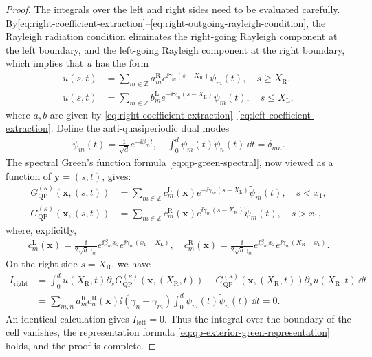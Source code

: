 \begin{proof}
The integrals over the left and right sides need to be evaluated carefully. By\eqref{eq:right-coefficient-extraction}--\eqref{eq:right-outgoing-rayleigh-condition},
the Rayleigh radiation condition eliminates the
right-going Rayleigh component at the left boundary, and the left-going Rayleigh component at the right boundary, which implies that $u$ has the form 
\begin{align*}
  u(s,t) &= \sum_{m\in\mathbb Z} a_m^\mathrm{R} e^{\ii\gamma_m (s - X_\mathrm{R})}\psi_m(t), \quad s \geq X_\mathrm{R},\\
  u(s,t) &= \sum_{m\in\mathbb Z} b_m^\mathrm{L} e^{-\ii\gamma_m (s - X_\mathrm{L})}\psi_m(t), \quad s \leq X_\mathrm{L},
\end{align*}
where $a, b$ are given by \eqref{eq:right-coefficient-extraction}--\eqref{eq:left-coefficient-extraction}. Define the anti-quasiperiodic dual modes 
\begin{align*}
  \widetilde{\psi}_m(t) = \frac{1}{\sqrt{d}} e^{-\ii \beta_m t},\quad \int_0^d \psi_m(t) \widetilde{\psi}_n(t) \, \dd t = \delta_{mn}.
\end{align*}
The spectral Green's function formula \eqref{eq:qp-green-spectral}, now viewed as a 
function of $\mathbf{y} = (s,t)$, gives: \begin{align*}
  G^{(\kappa)}_\mathrm{QP}(\mathbf{x},(s,t)) &= \sum_{m\in\mathbb Z} 
  c_m^\mathrm{L}(\mathbf{x}) e^{-\ii \gamma_m (s - X_\mathrm{L})} \widetilde\psi_m(t), \quad s < x_1,\\
  G^{(\kappa)}_\mathrm{QP}(\mathbf{x},(s,t)) &= \sum_{m\in\mathbb Z} 
  c_m^\mathrm{R}(\mathbf{x}) e^{\ii \gamma_m (s - X_\mathrm{R})} \widetilde\psi_m(t), \quad s > x_1,
\end{align*}
where, explicitly, \begin{align*}
  c_m^\mathrm{L}(\mathbf{x}) = \frac{\ii}{2\sqrt{d}\gamma_m} e^{\ii \beta_m x_2} 
  e^{\ii \gamma_m (x_1 - X_\mathrm{L})},\quad 
  c_m^\mathrm{R}(\mathbf{x}) = \frac{\ii}{2\sqrt{d}\gamma_m} e^{\ii \beta_m x_2}
  e^{\ii \gamma_m (X_\mathrm{R} - x_1)}.
\end{align*}
On the right side $s = X_\mathrm{R}$, we have \begin{align*}
  I_\mathrm{right} &= \int_0^d u(X_\mathrm{R},t) \partial_s G^{(\kappa)}_\mathrm{QP}(\mathbf{x},(X_\mathrm{R},t)) - G^{(\kappa)}_\mathrm{QP}(\mathbf{x},(X_\mathrm{R},t))\partial_s u(X_\mathrm{R},t)  \, \dd t\\
  &= \sum_{m,n} a_m^\mathrm{R} c_n^\mathrm{R}(\mathbf{x}) \ii(\gamma_n - \gamma_m) \int_0^d \psi_m(t) \widetilde{\psi}_n(t) \, \dd t = 0.
\end{align*}
An identical calculation gives $I_\mathrm{left} = 0$. Thus the integral over the boundary of the cell vanishes, the representation formula \eqref{eq:qp-exterior-green-representation} holds, and the proof is complete.
\end{proof}


